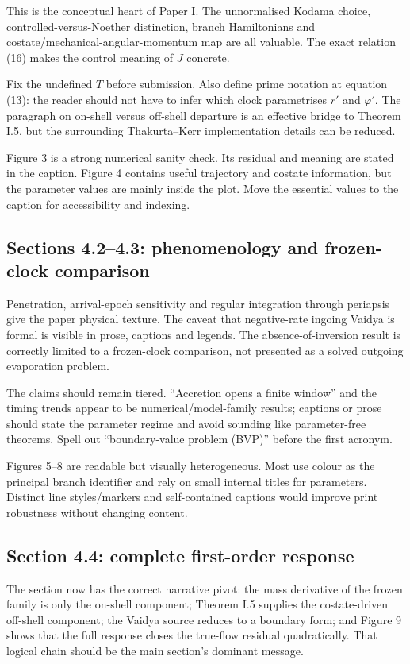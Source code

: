\documentclass[11pt,a4paper]{article}
\begin{document}
This is the conceptual heart of Paper I. The unnormalised Kodama choice, controlled-versus-Noether
distinction, branch Hamiltonians and costate/mechanical-angular-momentum map are all valuable.
The exact relation (16) makes the control meaning of $J$ concrete.

Fix the undefined $T$ before submission. Also define prime notation at equation (13): the
reader should not have to infer which clock parametrises $r'$ and $\varphi'$. The paragraph on
on-shell versus off-shell departure is an effective bridge to Theorem I.5, but the surrounding
Thakurta--Kerr implementation details can be reduced.

Figure 3 is a strong numerical sanity check. Its residual and meaning are stated in the caption.
Figure 4 contains useful trajectory and costate information, but the parameter values are mainly
inside the plot. Move the essential values to the caption for accessibility and indexing.

\subsection{Sections 4.2--4.3: phenomenology and frozen-clock comparison}

Penetration, arrival-epoch sensitivity and regular integration through periapsis give the paper
physical texture. The caveat that negative-rate ingoing Vaidya is formal is visible in prose,
captions and legends. The absence-of-inversion result is correctly limited to a frozen-clock
comparison, not presented as a solved outgoing evaporation problem.

The claims should remain tiered. ``Accretion opens a finite window'' and the timing trends appear
to be numerical/model-family results; captions or prose should state the parameter regime and
avoid sounding like parameter-free theorems. Spell out ``boundary-value problem (BVP)'' before
the first acronym.

Figures 5--8 are readable but visually heterogeneous. Most use colour as the principal branch
identifier and rely on small internal titles for parameters. Distinct line styles/markers and
self-contained captions would improve print robustness without changing content.

\subsection{Section 4.4: complete first-order response}

The section now has the correct narrative pivot: the mass derivative of the frozen family is
only the on-shell component; Theorem I.5 supplies the costate-driven off-shell component; the
Vaidya source reduces to a boundary form; and Figure 9 shows that the full response closes the
true-flow residual quadratically. That logical chain should be the main section's dominant
message.
\end{document}
